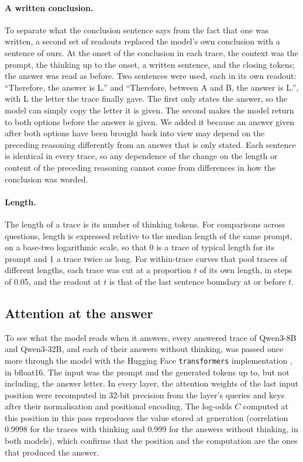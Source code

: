 \documentclass[11pt]{article}
\begin{document}
\paragraph{A written conclusion.}
To separate what the conclusion sentence says from the fact that one was written, a second set of readouts replaced the model's own conclusion with a sentence of ours. At the onset of the conclusion in each trace, the context was the prompt, the thinking up to the onset, a written sentence, and the closing tokens; the answer was read as before. Two sentences were used, each in its own readout: ``Therefore, the answer is L.'' and ``Therefore, between A and B, the answer is L.'', with L the letter the trace finally gave. The first only states the answer, so the model can simply copy the letter it is given. The second makes the model return to both options before the answer is given. We added it because an answer given after both options have been brought back into view may depend on the preceding reasoning differently from an answer that is only stated. Each sentence is identical in every trace, so any dependence of the change on the length or content of the preceding reasoning cannot come from differences in how the conclusion was worded.

\paragraph{Length.}
The length of a trace is its number of thinking tokens. For comparisons across questions, length is expressed relative to the median length of the same prompt, on a base-two logarithmic scale, so that 0 is a trace of typical length for its prompt and 1 a trace twice as long. For within-trace curves that pool traces of different lengths, each trace was cut at a proportion $t$ of its own length, in steps of 0.05, and the readout at $t$ is that of the last sentence boundary at or before $t$.

\subsection{Attention at the answer}
\label{sec:attention}

To see what the model reads when it answers, every answered trace of Qwen3-8B and Qwen3-32B, and each of their answers without thinking, was passed once more through the model with the Hugging Face \texttt{transformers} implementation \citep{wolf2020transformers}, in bfloat16. The input was the prompt and the generated tokens up to, but not including, the answer letter. In every layer, the attention weights of the last input position were recomputed in 32-bit precision from the layer's queries and keys after their normalisation and positional encoding. The log-odds $C$ computed at this position in this pass reproduces the value stored at generation (correlation 0.9998 for the traces with thinking and 0.999 for the answers without thinking, in both models), which confirms that the position and the computation are the ones that produced the answer.
\end{document}
